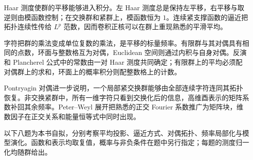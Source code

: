 





\begin{chaptersummary}
Haar 测度使群的平移能够进入积分。左 Haar 测度总是保持左平移，右平移与取逆则由模函数控制；在交换群和紧群上，模函数恒为 \(1\)。连续紧支撑函数的逼近把拓扑连续性传给 \(L^p\) 范数，因而卷积正核可以在群上重现熟悉的平滑平均。

\ProseParagraphBreak
字符把群的乘法变成单位复数的乘法，是平移的标量频率。有限群与其对偶具有相同的点数，环面与整数格互为对偶，Euclidean 空间则通过内积与自身对偶。反演和 Plancherel 公式中的常数由一对 Haar 测度共同确定；有限群上的平均必须配对偶群上的求和，环面上的概率积分则配整数格上的计数。

\ProseParagraphBreak
Pontryagin 对偶进一步说明，一个局部紧交换群能够由全部连续字符连同其拓扑恢复。非交换紧群中，所有一维字符只看到交换化后的信息，高维酉表示的矩阵系数补回其余频率。Peter--Weyl 展开把熟悉的正交 Fourier 系数推广为矩阵块，维数因子在正交关系和能量恒等式中同时出现。
\end{chaptersummary}

\BookExercises

以下八题为本书自拟，分别考察平均投影、逼近方式、对偶拓扑、频率局部化与模型演化。函数和表示均取复值，概率与非负条件在题中另行指定；每题的测度归一化均随群给出。

